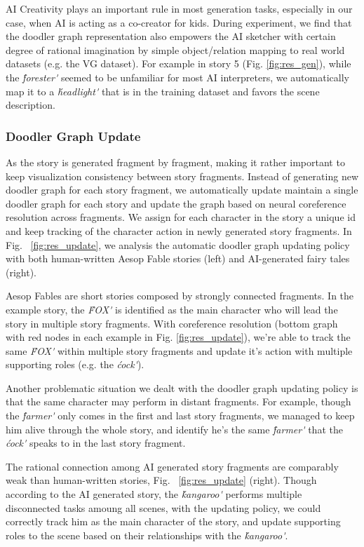  AI Creativity plays an important rule in most generation tasks, especially in our case, when AI is acting as a co-creator for kids. During experiment, we find that the doodler graph representation also empowers the AI sketcher with certain degree of rational imagination by simple object/relation mapping to real world datasets (e.g. the VG dataset\cite{Krishna2017}). For example in story 5 (Fig. \ref{fig:res_gen}), while the \textit{\'forester\'} seemed to be unfamiliar for most AI interpreters, we automatically map it to a \textit{\'headlight\'} that is in the training dataset and favors the scene description.

\subsubsection{Doodler Graph Update}
As the story is generated fragment by fragment, making it rather important to keep visualization consistency between story fragments. Instead of generating new doodler graph for each story fragment, we automatically update maintain a single doodler graph for each story and update the graph based on neural coreference resolution across fragments. We assign for each character in the story a unique id and keep tracking of the character action in newly generated story fragments. In Fig. ~\ref{fig:res_update}, we analysis the automatic doodler graph updating policy with both human-written Aesop Fable stories (left) and AI-generated fairy tales (right). 

Aesop Fables are short stories composed by strongly connected fragments. In the example story, the \textit{\'FOX\'} is identified as the main character who will lead the story in multiple story fragments. With coreference resolution (bottom graph with red nodes in each example in Fig. \ref{fig:res_update}), we're able to track the same \textit{\'FOX\'} within multiple story fragments and update it's action with multiple supporting roles (e.g. the \textit{\'cock\'}).

Another problematic situation we dealt with the doodler graph updating policy is that the same character may perform in distant fragments. For example, though the \textit{\'farmer\'} only comes in the first and last story fragments, we managed to keep him alive through the whole story, and identify he's the same \textit{\'farmer\'} that the \textit{\'cock\'} speaks to in the last story fragment.

The rational connection among AI generated story fragments are comparably weak than human-written stories, Fig. ~\ref{fig:res_update} (right). Though according to the AI generated story, the \textit{\'kangaroo\'} performs multiple disconnected tasks amoung all scenes, with the updating policy, we could correctly track him as the main character of the story, and update supporting roles to the scene based on their relationships with the \textit{\'kangaroo\'}.

